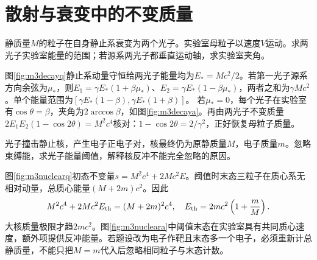 \section{散射与衰变中的不变质量}
\begin{example}\label{ex:m3decay}
静质量$M$的粒子在自身静止系衰变为两个光子。实验室母粒子以速度$V$运动。求两光子实验室能量的范围；若源系两光子都垂直运动轴，求实验室夹角。
\end{example}
\begin{solution}
图\ref{fig:m3decayq}静止系动量守恒给两光子能量均为$E_*=Mc^2/2$。若第一光子源系方向余弦为$\mu_*$，则$E_1=\gamma E_*(1+\beta\mu_*)$、$E_2=\gamma E_*(1-\beta\mu_*)$，两者之和为$\gamma Mc^2$。单个能量范围为$[\gamma E_*(1-\beta),\gamma E_*(1+\beta)]$。
若$\mu_*=0$，每个光子在实验室有$\cos\theta=\beta$，夹角为$2\arccos\beta$，如图\ref{fig:m3decaya}。再由两光子不变质量$2E_1E_2(1-\cos2\theta)=M^2c^4$核对：$1-\cos2\theta=2/\gamma^2$，正好恢复母粒子质量。
\end{solution}

\begin{example}\label{ex:m3nuclearpair}
光子撞击静止核，产生电子正电子对，核最终仍为原静质量$M$，电子质量$m$。忽略束缚能，求光子能量阈值，解释核反冲不能完全忽略的原因。
\end{example}
\begin{solution}
图\ref{fig:m3nuclearq}初态不变量$s=M^2c^4+2Mc^2E$。阈值时末态三粒子在质心系无相对动量，总质心能量$(M+2m)c^2$。因此
\[
 M^2c^4+2Mc^2E_{\rm th}=(M+2m)^2c^4,
\quad E_{\rm th}=2mc^2\left(1+\frac mM\right).
\]
大核质量极限才趋$2mc^2$。图\ref{fig:m3nucleara}中阈值末态在实验室具有共同质心速度，额外项提供反冲能量。若题设改为电子作靶且末态多一个电子，必须重新计总静质量，不能只把$M=m$代入后忽略相同粒子与末态计数。
\end{solution}

